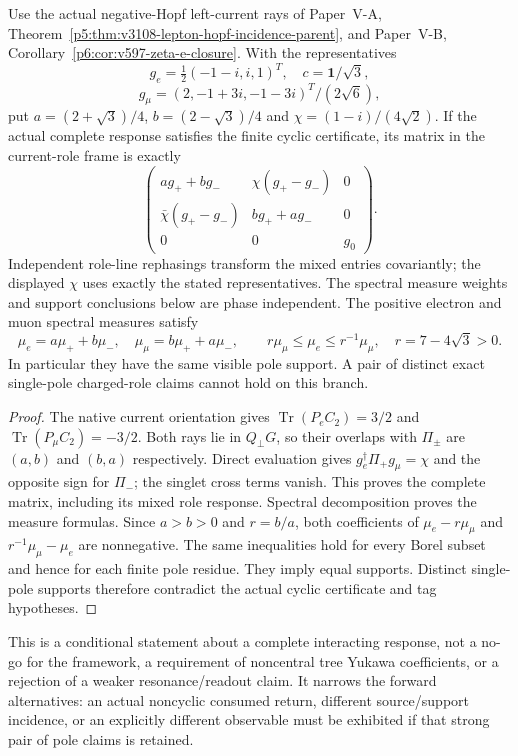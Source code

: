 \documentclass[12pt,a4paper]{article}
\begin{document}
\begin{theorem}
\label{p4:v251:thm:lepton-cyclic-response}
Use the actual negative-Hopf left-current rays of Paper~V-A,
Theorem~\ref{p5:thm:v3108-lepton-hopf-incidence-parent}, and Paper~V-B,
Corollary~\ref{p6:cor:v597-zeta-e-closure}. With the representatives
\[
 g_e=\tfrac12(-1-i,i,1)^T,\quad c=\mathbf1/\sqrt3,
\]
\[
 g_\mu=(2,-1+3i,-1-3i)^T/(2\sqrt6),
\]
put $a=(2+\sqrt3)/4$, $b=(2-\sqrt3)/4$ and
$\chi=(1-i)/(4\sqrt2)$. If the actual complete response satisfies the
finite cyclic certificate, its matrix in the current-role frame is exactly
\[
 \boxed{
 \begin{pmatrix}
 ag_++bg_-&\chi(g_+-g_-)&0\\
 \bar\chi(g_+-g_-)&bg_++ag_-&0\\
 0&0&g_0
 \end{pmatrix}.}
\]
Independent role-line rephasings transform the mixed entries covariantly;
the displayed $\chi$ uses exactly the stated representatives. The spectral
measure weights and support conclusions below are phase independent.
The positive electron and muon spectral measures satisfy
\[
 \mu_e=a\mu_++b\mu_-,\quad
 \mu_\mu=b\mu_++a\mu_-,\qquad
 \boxed{r\mu_\mu\le\mu_e\le r^{-1}\mu_\mu,\quad r=7-4\sqrt3>0.}
\]
In particular they have the same visible pole support. A pair of distinct
exact single-pole charged-role claims cannot hold on this branch.
\end{theorem}
\begin{proof}
The native current orientation gives
$\operatorname{Tr}(P_eC_2)=3/2$ and
$\operatorname{Tr}(P_\mu C_2)=-3/2$.
Both rays lie in $Q_\perp G$, so their overlaps with $\Pi_\pm$ are
$(a,b)$ and $(b,a)$ respectively. Direct evaluation gives
$g_e^\dagger\Pi_+g_\mu=\chi$ and the opposite sign for $\Pi_-$;
the singlet cross terms vanish. This proves the complete matrix, including
its mixed role response. Spectral decomposition proves the measure formulas.
Since $a>b>0$ and $r=b/a$, both coefficients of
$\mu_e-r\mu_\mu$ and $r^{-1}\mu_\mu-\mu_e$ are nonnegative.
The same inequalities hold for every Borel subset and hence for each finite
pole residue. They imply equal supports. Distinct single-pole supports
therefore contradict the actual cyclic certificate and tag hypotheses.
\end{proof}

This is a conditional statement about a complete interacting response,
not a no-go for the framework, a requirement of noncentral tree Yukawa
coefficients, or a rejection of a weaker resonance/readout claim. It narrows
the forward alternatives: an actual noncyclic consumed return, different
source/support incidence, or an explicitly different observable must be
exhibited if that strong pair of pole claims is retained.
\end{document}
